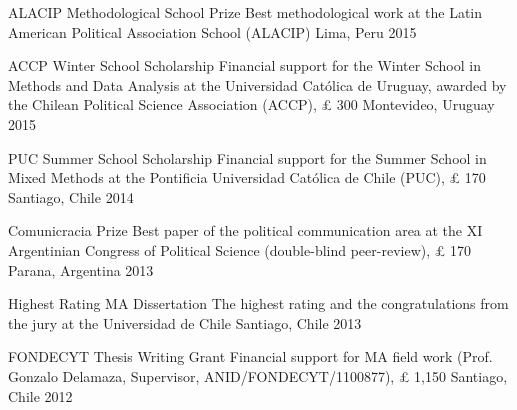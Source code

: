\vspace{1mm}

\begin{cvhonors}
\cvhonor
{ALACIP Methodological School Prize}
{Best methodological work at the Latin American Political Association School (ALACIP)}
{Lima, Peru}
{2015}
\end{cvhonors}

\vspace{1mm}

\begin{cvhonors}
\cvhonor
{ACCP Winter School Scholarship}
{Financial support for the Winter School in Methods and Data Analysis at the Universidad Cat\'olica de Uruguay, awarded by the Chilean Political Science Association (ACCP), {\pounds} 300}
{Montevideo, Uruguay}
{ 2015}
\end{cvhonors}

\vspace{1mm}

\begin{cvhonors}
\cvhonor
{PUC Summer School Scholarship}
{Financial support for the Summer School in Mixed Methods at the Pontificia Universidad Cat\'olica de Chile (PUC), {\pounds} 170}
{Santiago, Chile}
{2014} 
\end{cvhonors}

\vspace{1mm}

\begin{cvhonors}
\cvhonor
{Comunicracia Prize}
{Best paper of the political communication area at the XI Argentinian Congress of Political Science (double-blind peer-review), {\pounds} 170}
{Parana, Argentina}
{2013}
\end{cvhonors}

\vspace{1mm}

\begin{cvhonors}
\cvhonor
{Highest Rating MA Dissertation}
{The highest rating and the congratulations from the jury at the Universidad de Chile}
{Santiago, Chile}
{2013}
\end{cvhonors}

\vspace{1mm}

\begin{cvhonors}
\cvhonor
{FONDECYT Thesis Writing Grant}
{Financial support for MA field work (Prof. Gonzalo Delamaza, Supervisor, ANID/FONDECYT/1100877), {\pounds} 1,150}
{Santiago, Chile}
{2012}
\end{cvhonors}

\vspace{1mm}
